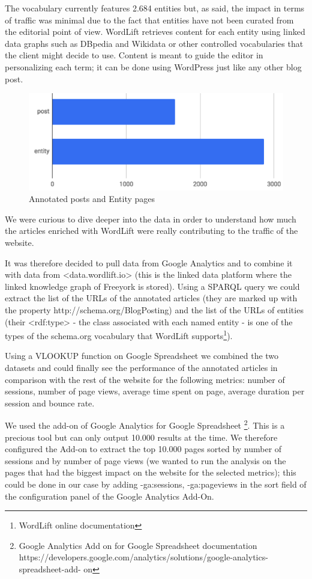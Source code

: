 \documentclass[runningheads,a4paper]{llncs}
\makeatletter
\def\maxwidth#1{\ifdim\Gin@nat@width>#1 #1\else\Gin@nat@width\fi}
\makeatother
\begin{document}
The vocabulary currently features 2.684 entities but, as said, the
 impact in terms of traffic was minimal due to the fact that entities
 have not been curated from the editorial point of view. WordLift
 retrieves content for each entity using linked data graphs such as
 DBpedia and Wikidata or other controlled vocabularies that the
 client might decide to use. Content is meant to guide the editor in
personalizing each term; it can be done using WordPress just like
 any other blog post.
\begin{figure}[h!]
\centering
\includegraphics[width=\maxwidth{\textwidth}]{img/1000020100000237000000D8586509E1.png}
\cprotect\caption{Annotated posts and Entity pages}
\label{}
\end{figure}


We were curious to dive deeper into the data in order to understand how much the articles enriched with WordLift were really
 contributing to the traffic of the website.

It was therefore decided to pull data from Google Analytics
 and to combine it with data from \textless{}data.wordlift.io\textgreater{} (this is
 the linked data platform where the linked knowledge graph of
 Freeyork is stored). Using a SPARQL query we could extract the list
 of the URLs of the annotated articles (they are marked up with the
 property http://schema.org/BlogPosting) and the list of the
 URLs of entities (their \textless{}rdf:type\textgreater{} - the class associated with each
 named entity - is one of the types of the schema.org vocabulary
 that WordLift supports\footnote{WordLift
 online documentation}).

Using a VLOOKUP function on Google Spreadsheet we combined the two datasets and could finally see the performance of
 the annotated articles in comparison with the rest of the website
 for the following metrics: number of sessions, number of page
 views, average time spent on page, average duration per session
 and bounce rate.

We used the add-on of Google Analytics for Google Spreadsheet
\footnote{Google
 Analytics Add on for Google Spreadsheet documentation
 https://developers.google.com/analytics/solutions/google-analytics-spreadsheet-add-
on }. This is a precious tool but can only output 10.000 results at the
 time. We therefore configured the Add-on to extract the top 10.000
 pages sorted by number of sessions and by number of page views
 (we wanted to run the analysis on the pages that had the biggest
 impact on the website for the selected metrics); this could be done
 in our case by adding -ga:sessions, -ga:pageviews in the sort
 field of the configuration panel of the Google Analytics Add-On.
\end{document}
